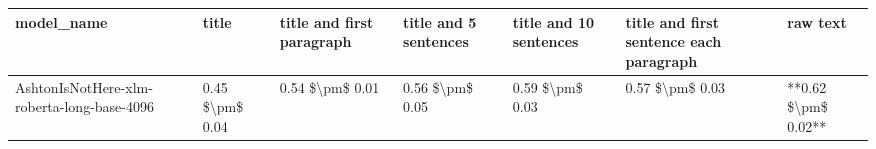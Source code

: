 \begin{tabular}{lllllll}
\toprule
                                model\_name &           title & title and first paragraph & title and 5 sentences & title and 10 sentences & title and first sentence each paragraph &            raw text \\
\midrule
AshtonIsNotHere-xlm-roberta-long-base-4096 & 0.45 \$\textbackslash pm\$ 0.04 &           0.54 \$\textbackslash pm\$ 0.01 &       0.56 \$\textbackslash pm\$ 0.05 &        0.59 \$\textbackslash pm\$ 0.03 &                         0.57 \$\textbackslash pm\$ 0.03 & **0.62 \$\textbackslash pm\$ 0.02** \\
\bottomrule
\end{tabular}
